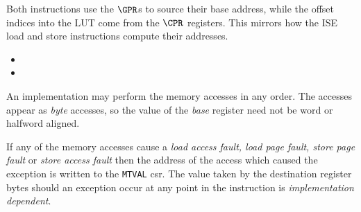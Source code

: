 Both instructions use the $\GPR$s to source their base address, while the
offset indices into the LUT come from the $\CPR$ registers. This mirrors
how the ISE load and store instructions compute their addresses.

\begin{itemize}
\item {}
\item {}
\end{itemize}


An implementation may perform the memory accesses in any order. The accesses
appear as {\em byte} accesses, so the value of the {\em base} register
need not be word or halfword aligned.

If any of the memory accesses cause
a {\em load access fault, load page fault, store page fault} or
{\em store access fault} then the address of the access which caused the
exception is written to the {\tt MTVAL} csr. The value taken by the
destination register bytes should an exception occur at any point in the
instruction is {\em implementation dependent}.

